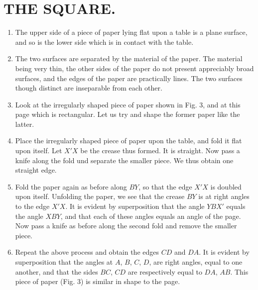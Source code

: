 

\chapter{THE SQUARE.}

\begin{enumerate}

    \item The upper side of a piece of paper lying flat upon a table is a plane
        surface, and so is the lower side which is in contact with the table.

    \item The two surfaces are separated by the material of the paper. The
        material being very thin, the other sides of the paper do not present
        appreciably broad surfaces, and the edges of the paper are practically
        lines. The two surfaces though distinct are inseparable from each other.

    \item Look at the irregularly shaped piece of paper shown in Fig. 3, and at
        this page which is rectangular. Let us try and shape the former paper
        like the latter.

    \item Place the irregularly shaped piece of paper upon the table, and fold
        it flat upon itself. Let $X'X$ be the crease thus formed. It is
        straight. Now pass a knife along the fold und separate the smaller
        piece.  We thus obtain one straight edge.
    
    \item Fold the paper again as before along $BY$, so that the edge $X'X$ is
        doubled upon itself. Unfolding the paper, we see that the crease $BY$ is
        at right angles to the edge $X'X$. It is evident by superposition that
        the angle $YBX'$ equals the angle $XBY$, and that each of these angles
        equals an angle of the page. Now pass a knife as before along the second
        fold and remove the smaller piece.
    
    \item Repeat the above process and obtain the edges $CD$ and $DA$. It is
        evident by superposition that the angles at $A$, $B$, $C$, $D$, are
        right angles, equal to one another, and that the sides $BC$, $CD$ are
        respectively equal to $DA$, $AB$.  This piece of paper (Fig. 3) is
        similar in shape to the page.
    

\end{enumerate}
